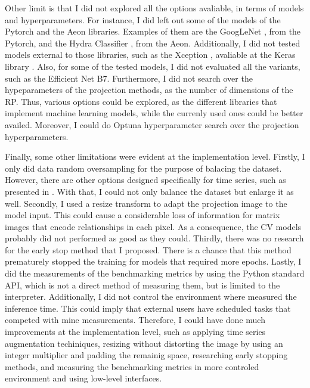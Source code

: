Other limit is that I did not explored all the options avaliable, in terms of models and hyperparameters. For instance, I did left out some of the models of the Pytorch and the Aeon libraries. Examples of them are the GoogLeNet \cite{GoogLeNet}, from the Pytorch, and the Hydra Classifier \cite{HydraClassifier}, from the Aeon. Additionally, I did not tested models external to those libraries, such as the Xception \cite{Xception}, avaliable at the Keras library \cite{Keras}. Also, for some of the tested models, I did not evaluated all the variants, such as the Efficient Net B7. Furthermore, I did not search over the hypeparameters of the projection methods, as the number of dimensions of the \gls{RP}. Thus, various options could be explored, as the different libraries that implement machine learning models, while the currenly used ones could be better availed. Moreover, I could do Optuna hyperparameter search over the projection hyperparameters.

Finally, some other limitations were evident at the implementation level. Firstly, I only did data random oversampling for the purpose of balacing the dataset. However, there are other options designed specifically for time series, such as presented in \cite{TimeSeriesAugmentation}. With that, I could not only balance the dataset but enlarge it as well. Secondly, I used a resize transform to adapt the projection image to the model input. This could cause a considerable loss of information for matrix images that encode relationships in each pixel. As a consequence, the \gls{CV} models probably did not performed as good as they could. Thirdly, there was no research for the early stop method that I proposed. There is a chance that this method prematurely stopped the training for models that required more epochs. Lastly, I did the measurements of the benchmarking metrics by using the Python standard API, which is not a direct method of measuring them, but is limited to the interpreter. Additionally, I did not control the environment where measured the inference time. This could imply that external users have scheduled tasks that competed with mine measurements. Therefore, I could have done much improvements at the implementation level, such as applying time series augmentation techiniques, resizing without distorting the image by using an integer multiplier and padding the remainig space, researching early stopping methods, and measuring the benchmarking metrics in more controled environment and using low-level interfaces.        
